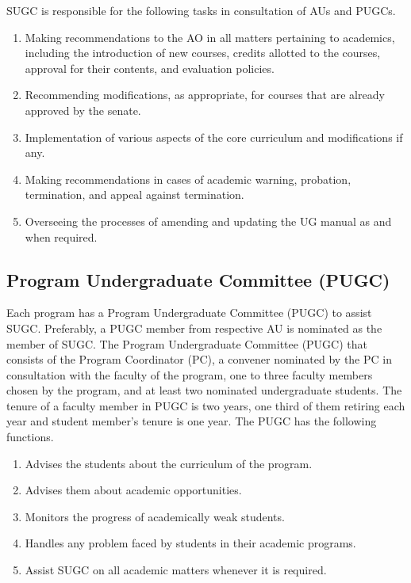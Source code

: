\documentclass[a4paper, 12pt]{article}
\begin{document}
SUGC is responsible for the following tasks in consultation of AUs and PUGCs.

\begin{enumerate}
	\item Making recommendations to the AO in all matters pertaining to academics, including the introduction of new courses, credits allotted to the courses, approval for their contents, and evaluation policies.
	\item Recommending modifications, as appropriate, for courses that are already approved by the senate.
	\item Implementation of various aspects of the core curriculum and modifications if any.
	\item Making recommendations in cases of academic warning, probation, termination, and appeal against termination.
	\item Overseeing the processes of amending and updating the UG manual as and when required. 
\end{enumerate}

\subsection{Program Undergraduate Committee (PUGC)}

Each program has a Program Undergraduate Committee (PUGC) to assist SUGC. Preferably, a PUGC member from respective AU is nominated as the member of SUGC. The Program Undergraduate Committee (PUGC) that consists of the Program Coordinator (PC), a convener nominated by the PC in consultation with the faculty of the program, one to three faculty members chosen by the program, and at least two nominated undergraduate students. The tenure of a faculty member in PUGC is two years, one third of them retiring each year and student member’s tenure is one year. The PUGC has the following functions.

\begin{enumerate}
	\item Advises the students about the curriculum of the program. 
	\item Advises them about academic opportunities. 
	\item Monitors the progress of academically weak students. 
	\item Handles any problem faced by students in their academic programs.
	\item Assist SUGC on all academic matters whenever it is required.
\end{enumerate}
\end{document}
